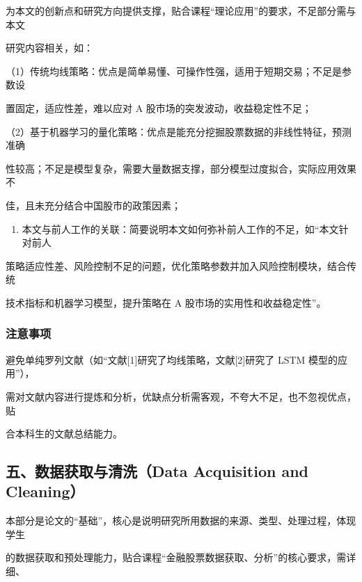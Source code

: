 \documentclass[
]{article}
\providecommand{\tightlist}{%
  \setlength{\itemsep}{0pt}\setlength{\parskip}{0pt}}
\begin{document}
为本文的创新点和研究方向提供支撑，贴合课程``理论应用''的要求，不足部分需与本文

研究内容相关，如：

（1）传统均线策略：优点是简单易懂、可操作性强，适用于短期交易；不足是参数设

置固定，适应性差，难以应对 A 股市场的突发波动，收益稳定性不足；

（2）基于机器学习的量化策略：优点是能充分挖掘股票数据的非线性特征，预测准确

性较高；不足是模型复杂，需要大量数据支撑，部分模型过度拟合，实际应用效果不

佳，且未充分结合中国股市的政策因素；

\begin{enumerate}
\def\labelenumi{\arabic{enumi}.}
\setcounter{enumi}{3}
\tightlist
\item
  本文与前人工作的关联：简要说明本文如何弥补前人工作的不足，如``本文针对前人
\end{enumerate}

策略适应性差、风险控制不足的问题，优化策略参数并加入风险控制模块，结合传统

技术指标和机器学习模型，提升策略在 A 股市场的实用性和收益稳定性''。

\hypertarget{ux6ce8ux610fux4e8bux9879-1}{%
\subsubsection{\texorpdfstring{\textbf{注意事项}}{注意事项}}\label{ux6ce8ux610fux4e8bux9879-1}}

避免单纯罗列文献（如``文献{[}1{]}研究了均线策略，文献{[}2{]}研究了 LSTM
模型的应用''），

需对文献内容进行提炼和分析，优缺点分析需客观，不夸大不足，也不忽视优点，贴

合本科生的文献总结能力。

\hypertarget{ux4e94ux6570ux636eux83b7ux53d6ux4e0eux6e05ux6d17data-acquisition-and-cleaning}{%
\subsection{\texorpdfstring{\textbf{五、数据获取与清洗（Data Acquisition
and}
\textbf{Cleaning）}}{五、数据获取与清洗（Data Acquisition and Cleaning）}}\label{ux4e94ux6570ux636eux83b7ux53d6ux4e0eux6e05ux6d17data-acquisition-and-cleaning}}

本部分是论文的``基础''，核心是说明研究所用数据的来源、类型、处理过程，体现学生

的数据获取和预处理能力，贴合课程``金融股票数据获取、分析''的核心要求，需详细、
\end{document}
